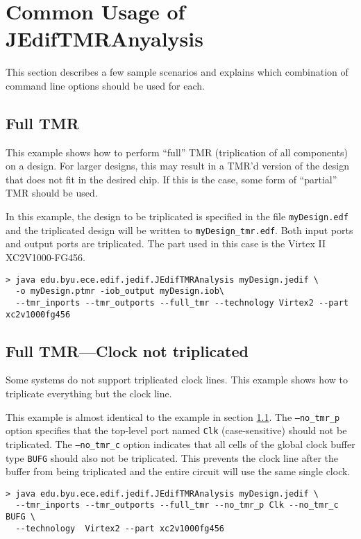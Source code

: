 \section{Common Usage of JEdifTMRAnyalysis}
This section describes a few sample scenarios and explains which combination of
command line options should be used for each.

\subsection{Full TMR}
\label{subsec:fulltmr}
This example shows how to perform ``full'' TMR (triplication of all components) 
on a design. For larger designs, this may result in a TMR'd version of the 
design that does not fit in the desired chip. If this is the case, some form of 
``partial'' TMR should be used.

In this example, the design to be triplicated is specified in the file 
\texttt{myDesign.edf} and the triplicated design will be written to 
\texttt{myDesign\_tmr.edf}. Both input ports and output ports are triplicated. 
The part used in this case is the Virtex II XC2V1000-FG456.

\begin{verbatim}
> java edu.byu.ece.edif.jedif.JEdifTMRAnalysis myDesign.jedif \
  -o myDesign.ptmr -iob_output myDesign.iob\
  --tmr_inports --tmr_outports --full_tmr --technology Virtex2 --part xc2v1000fg456
\end{verbatim}


\subsection{Full TMR---Clock not triplicated}
Some systems do not support triplicated clock lines. This example shows how to 
triplicate everything but the clock line.

This example is almost identical to the example in section 
\ref{subsec:fulltmr}. The \texttt{--no\_tmr\_p} option specifies that the 
top-level port named \texttt{Clk} (case-sensitive) should not be triplicated. 
The \texttt{--no\_tmr\_c} option indicates that all cells of the global clock 
buffer type \texttt{BUFG} should also not be triplicated. This prevents the 
clock line after the buffer from being triplicated and the entire circuit will 
use the same single clock.

\begin{verbatim}
> java edu.byu.ece.edif.jedif.JEdifTMRAnalysis myDesign.jedif \
  --tmr_inports --tmr_outports --full_tmr --no_tmr_p Clk --no_tmr_c BUFG \
  --technology  Virtex2 --part xc2v1000fg456
\end{verbatim}


